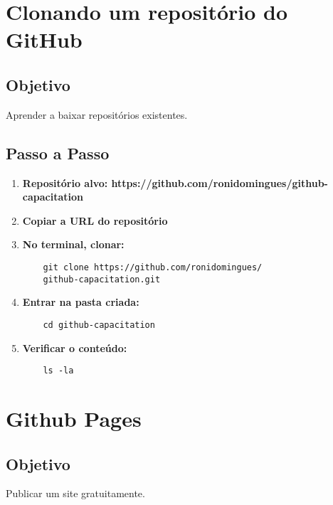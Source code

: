 \section{Clonando um repositório do GitHub}

\subsection{Objetivo}
Aprender a baixar repositórios existentes.

\subsection{Passo a Passo}
\begin{enumerate}
    \item \textbf{Repositório alvo: https://github.com/ronidomingues/github-capacitation}
    
    \item \textbf{Copiar a URL do repositório}
    
    \item \textbf{No terminal, clonar:}
    \begin{verbatim}
    git clone https://github.com/ronidomingues/
    github-capacitation.git
    \end{verbatim}
    
    \item \textbf{Entrar na pasta criada:}
    \begin{verbatim}
    cd github-capacitation
    \end{verbatim}
    
    \item \textbf{Verificar o conteúdo:}
    \begin{verbatim}
    ls -la
    \end{verbatim}
\end{enumerate}

\section{Github Pages}

\subsection{Objetivo}
Publicar um site gratuitamente.

